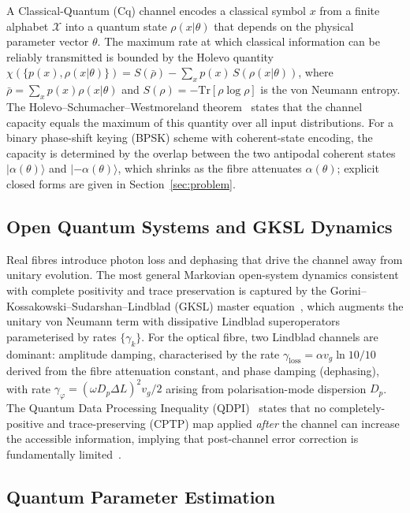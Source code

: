 \documentclass[journal,twocolumn]{IEEEtran}
\theoremstyle{definition}
\theoremstyle{plain}
\newcommand{\Tr}{\mathrm{Tr}}
\begin{document}
A Classical-Quantum (Cq) channel encodes a classical symbol $x$
from a finite alphabet $\mathcal{X}$ into a quantum state
$\rho(x|\theta)$ that depends on the physical parameter vector
$\theta$.  The maximum rate at which classical information can be
reliably transmitted is bounded by the Holevo quantity
$\chi(\{p(x),\rho(x|\theta)\}) = S(\bar\rho) - \sum_x p(x)\,
S(\rho(x|\theta))$, where $\bar\rho = \sum_x p(x)\rho(x|\theta)$
and $S(\rho) = -\Tr[\rho\log\rho]$ is the von Neumann entropy.  The
Holevo--Schumacher--Westmoreland theorem~\cite{holevo1973,schumacher1997}
states that the channel capacity equals the maximum of this quantity
over all input distributions.  For a binary phase-shift keying
(BPSK) scheme with coherent-state encoding, the capacity is
determined by the overlap between the two antipodal coherent states
$|\alpha(\theta)\rangle$ and $|-\alpha(\theta)\rangle$, which
shrinks as the fibre attenuates $\alpha(\theta)$; explicit closed
forms are given in Section~\ref{sec:problem}.

\subsection{Open Quantum Systems and GKSL Dynamics}

Real fibres introduce photon loss and dephasing that drive the
channel away from unitary evolution.  The most general
Markovian open-system dynamics consistent with complete positivity
and trace preservation is captured by the
Gorini--Kossakowski--Sudarshan--Lindblad (GKSL) master
equation~\cite{gorini1976,lindblad1976}, which augments the
unitary von Neumann term with dissipative Lindblad superoperators
parameterised by rates $\{\gamma_k\}$.  For the optical fibre, two
Lindblad channels are dominant: amplitude damping, characterised
by the rate $\gamma_{\mathrm{loss}} = \alpha v_g \ln 10 / 10$
derived from the fibre attenuation constant, and phase damping
(dephasing), with rate $\gamma_\varphi = (\omega D_p \Delta L)^2
v_g / 2$ arising from polarisation-mode dispersion $D_p$.  The
Quantum Data Processing Inequality (QDPI)~\cite{nielsen2000} states
that no completely-positive and trace-preserving (CPTP) map applied
\emph{after} the channel can increase the accessible information,
implying that post-channel error correction is fundamentally
limited~\cite{giovannetti2014}.

\subsection{Quantum Parameter Estimation}
\end{document}
